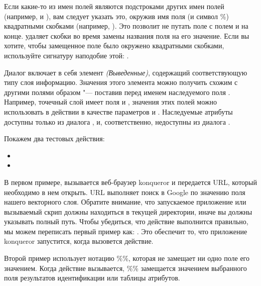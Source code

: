Если какие-то из имен полей являются подстроками других имен полей (например,
 и ), вам следует указать это, окружив имя
поля (и символ \%) квадратными скобками (например, \usertext{[\%col10]}).
Это позволит не путать поле  с полем  и
 на конце. \qg удаляет скобки во время замены названия поля
на его значение. Если вы хотите, чтобы замещенное поле было окружено
квадратными скобками, используйте сигнатуру наподобие этой: \usertext{[[\%col10]]}.

Диалог  включает в себя элемент {\em (Выведенные)},
содержащий соответствующую типу слоя информацию. Значения этого элемента
можно получить схожим с другими полями образом "--- поставив перед именем
наследуемого поля . Например, точечный слой имеет поля
 и , значения этих полей можно использовать в действии
в качестве параметров  и .
Наследуемые атрибуты доступны только из диалога ,
и, соответственно, недоступны из диалога .

Покажем два тестовых действия:

\begin{itemize}[label=--]
  \item {}
  \item {}
\end{itemize}

В первом примере, вызывается веб-браузер konqueror и передается URL, который
необходимо в нем открыть. URL выполняет поиск в Google по значению поля
 нашего векторного слоя. Обратите внимание, что запускаемое
приложение или вызываемый скрип должны находиться в текущей директории,
иначе вы должны указывать полный путь. Чтобы убедиться, что действие
выполнится правильно, мы можем переписать первый пример как:
. Это
обеспечит то, что приложение konqueror запустится, когда вызовется действие.

Второй пример использует нотацию \%\%, которая не замещает ни одно поле
его значением. Когда действие вызывается, \%\% замещается значением выбранного
поля результатов идентификации или таблицы атрибутов.

\label{label_usingactions}

